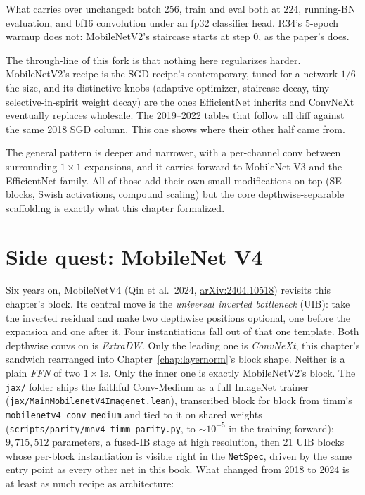 \noindent What carries over unchanged: batch 256, train and eval both
at $224$, running-BN evaluation, and bf16 convolution under an fp32
classifier head. R34's
5-epoch warmup does not: MobileNetV2's staircase starts at step $0$, as
the paper's does.

The through-line of this fork is that nothing here regularizes harder.
MobileNetV2's recipe is the SGD recipe's contemporary, tuned for a
network $1/6$ the size, and its distinctive knobs (adaptive
optimizer, staircase decay, tiny selective-in-spirit weight decay)
are the ones EfficientNet inherits and ConvNeXt eventually replaces
wholesale. The 2019--2022 tables that follow all diff against the
same 2018 SGD column. This one shows where their other half came
from.

The general pattern is deeper and narrower, with a per-channel conv
between surrounding $1 \times 1$ expansions, and it carries forward to
MobileNet V3 and the EfficientNet family. All of those add their own
small modifications on top (SE blocks, Swish activations, compound
scaling) but the core depthwise-separable scaffolding is exactly what
this chapter formalized.

\section{Side quest: MobileNet V4}
\label{sec:mnv4_side_quest}

Six years on, MobileNetV4 (Qin et al.\ 2024,
\href{https://arxiv.org/abs/2404.10518}{arXiv:2404.10518}) revisits
this chapter's block. Its central move is the \emph{universal
inverted bottleneck} (UIB): take the inverted residual and make two
depthwise positions optional, one before the expansion and one after
it. Four instantiations fall out of that one template. Both
depthwise convs on is \emph{ExtraDW}. Only the leading one is
\emph{ConvNeXt}, this chapter's sandwich rearranged into
Chapter~\ref{chap:layernorm}'s block shape. Neither is a plain
\emph{FFN} of two $1\times1$s. Only the inner one is exactly
MobileNetV2's block. The \texttt{jax/} folder ships the faithful
Conv-Medium as a full ImageNet trainer
(\texttt{jax/MainMobilenetV4Imagenet.lean}), transcribed block for
block from timm's \texttt{mobilenetv4\_conv\_medium} and tied to it on
shared weights (\texttt{scripts/parity/\allowbreak mnv4\_timm\_parity.py},
to $\sim\!10^{-5}$ in the training forward): $9{,}715{,}512$
parameters, a fused-IB stage at high resolution, then 21 UIB blocks
whose per-block instantiation is visible right in the
\texttt{NetSpec}, driven by the same entry point as every other net
in this book. What changed from 2018 to 2024 is at
least as much recipe as architecture:

